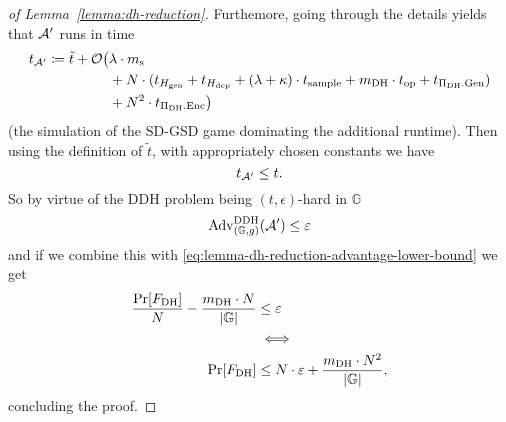 \begin{proof}[of Lemma~\ref{lemma:dh-reduction}]
	Furthemore, going through the details yields that $\mathcal{A}'$ runs in time
	\begin{align*}
		\begin{split}
			t_{\mathcal{A}'} \coloneqq \tilde{t} + \mathcal{O}\big(& \lambda \cdot m_\mathrm{s} \\
			& + N \cdot (t_{H_\mathrm{gen}} + t_{H_\mathrm{dep}} + (\lambda + \kappa) \cdot t_{\mathrm{sample}} + m_\mathrm{DH} \cdot t_{\mathrm{op}} + t_{\Pi_{\mathrm{DH}}.\mathrm{Gen}})  \\
			& +  N^2 \cdot t_{\Pi_{\mathrm{DH}}.\mathrm{Enc}}\big)
		\end{split}
	\end{align*}
	(the simulation of the SD-GSD game dominating the additional runtime). Then using the definition of $\tilde{t}$, with appropriately chosen constants we have
	\[
		t_{\mathcal{A}'} \le t.
	\]
	So by virtue of the DDH problem being $(t, \epsilon)$-hard in $\mathbb{G}$
	\[
		\mathrm{Adv}_{(\mathbb{G}, g)}^{\mathrm{DDH}}(\mathcal{A}') \le \varepsilon
	\]
	and if we combine this with \eqref{eq:lemma-dh-reduction-advantage-lower-bound} we get
	\begin{align*}
		\frac{\pr{\fdh}}{N} - \frac{\mdh \cdot N}{\abs{\mathbb{G}}} & \le \epsilon                                                    \\
		                                                            & \iff                                                            \\
		\pr{\fdh}                                                   & \le N \cdot \epsilon + \frac{\mdh \cdot N^2}{\abs{\mathbb{G}}},
	\end{align*}
	concluding the proof.
\end{proof}
